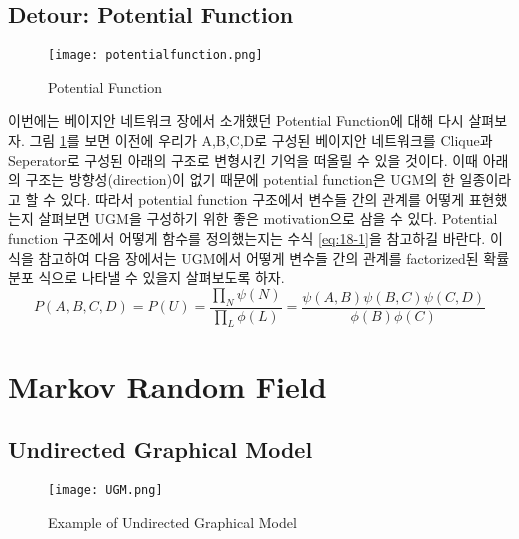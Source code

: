 \documentclass[draft=false]{oblivoir}
\begin{document}
\subsection{Detour: Potential Function}

\begin{figure}[ht] \centering 
  \texttt{[image: potentialfunction.png]}
  \caption{Potential Function}
  \label{fig:18-2}
\end{figure}

이번에는 베이지안 네트워크 장에서 소개했던 Potential Function에 대해 다시 살펴보자. 그림 \ref{fig:18-2}를 보면 이전에 우리가 A,B,C,D로 구성된 베이지안 네트워크를 Clique과 Seperator로 구성된 아래의 구조로 변형시킨 기억을 떠올릴 수 있을 것이다. 이때 아래의 구조는 방향성(direction)이 없기 때문에 potential function은 UGM의 한 일종이라고 할 수 있다. 따라서 potential function 구조에서 변수들 간의 관계를 어떻게 표현했는지 살펴보면 UGM을 구성하기 위한 좋은 motivation으로 삼을 수 있다. Potential function 구조에서 어떻게 함수를 정의했는지는 수식 \ref{eq:18-1}을 참고하길 바란다. 이 식을 참고하여 다음 장에서는 UGM에서 어떻게 변수들 간의 관계를 factorized된 확률 분포 식으로 나타낼 수 있을지 살펴보도록 하자.  
\begin{equation}
P(A,B,C,D) = P(U) = \frac{ \prod_{N} \psi(N) }{ \prod_{L} \phi(L) } = \frac{\psi(A,B)\psi(B,C)\psi(C,D) }{ \phi(B) \phi(C) }
\label{eq:18-1}
\end{equation} 


\section{Markov Random Field}

\subsection{Undirected Graphical Model}

\begin{figure}[ht] \centering 
  \texttt{[image: UGM.png]}
  \caption{Example of Undirected Graphical Model}
  \label{fig:18-3}
\end{figure}
\end{document}
